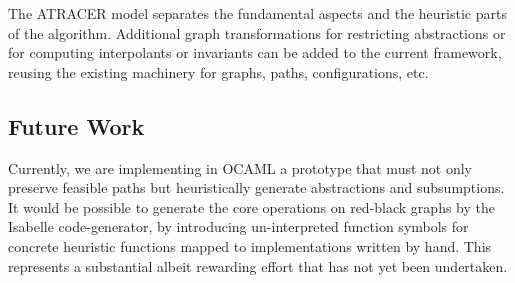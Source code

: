 The ATRACER model separates the
fundamental aspects and the heuristic parts of the algorithm.
Additional graph transformations for restricting abstractions
or for computing interpolants or invariants
can be added to the current framework, reusing the existing machinery
for graphs, paths, configurations, etc. 

\subsection{Future Work}
Currently, we are implementing in OCAML a prototype that must not
only preserve feasible paths but heuristically generate abstractions and 
subsumptions.
It would be possible to generate the core operations on red\hyp{}black graphs 
by the Isabelle code-generator, by introducing un-interpreted function symbols
for concrete heuristic functions mapped to implementations written by 
hand. This represents a substantial albeit rewarding effort that has not yet 
been undertaken.
